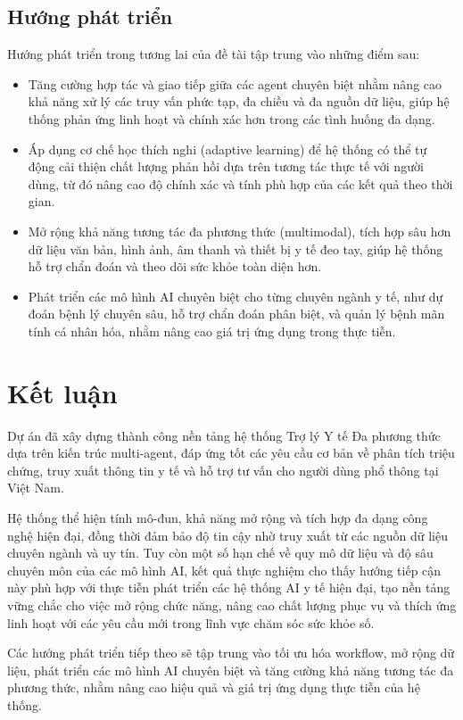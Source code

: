 \subsection{Hướng phát triển}

Hướng phát triển trong tương lai của đề tài tập trung vào những điểm sau:

\begin{itemize}
    \item Tăng cường hợp tác và giao tiếp giữa các agent chuyên biệt nhằm nâng cao khả năng xử lý các truy vấn phức tạp, đa chiều và đa nguồn dữ liệu, giúp hệ thống phản ứng linh hoạt và chính xác hơn trong các tình huống đa dạng.

    \item Áp dụng cơ chế học thích nghi (adaptive learning) để hệ thống có thể tự động cải thiện chất lượng phản hồi dựa trên tương tác thực tế với người dùng, từ đó nâng cao độ chính xác và tính phù hợp của các kết quả theo thời gian.
    
    \item Mở rộng khả năng tương tác đa phương thức (multimodal), tích hợp sâu hơn dữ liệu văn bản, hình ảnh, âm thanh và thiết bị y tế đeo tay, giúp hệ thống hỗ trợ chẩn đoán và theo dõi sức khỏe toàn diện hơn.

    \item Phát triển các mô hình AI chuyên biệt cho từng chuyên ngành y tế, như dự đoán bệnh lý chuyên sâu, hỗ trợ chẩn đoán phân biệt, và quản lý bệnh mãn tính cá nhân hóa, nhằm nâng cao giá trị ứng dụng trong thực tiễn.
\end{itemize}

\section{Kết luận}

Dự án đã xây dựng thành công nền tảng hệ thống Trợ lý Y tế Đa phương thức dựa trên kiến trúc multi-agent, đáp ứng tốt các yêu cầu cơ bản về phân tích triệu chứng, truy xuất thông tin y tế và hỗ trợ tư vấn cho người dùng phổ thông tại Việt Nam. 

Hệ thống thể hiện tính mô-đun, khả năng mở rộng và tích hợp đa dạng công nghệ hiện đại, đồng thời đảm bảo độ tin cậy nhờ truy xuất từ các nguồn dữ liệu chuyên ngành và uy tín. Tuy còn một số hạn chế về quy mô dữ liệu và độ sâu chuyên môn của các mô hình AI, kết quả thực nghiệm cho thấy hướng tiếp cận này phù hợp với thực tiễn phát triển các hệ thống AI y tế hiện đại, tạo nền tảng vững chắc cho việc mở rộng chức năng, nâng cao chất lượng phục vụ và thích ứng linh hoạt với các yêu cầu mới trong lĩnh vực chăm sóc sức khỏe số. 

Các hướng phát triển tiếp theo sẽ tập trung vào tối ưu hóa workflow, mở rộng dữ liệu, phát triển các mô hình AI chuyên biệt và tăng cường khả năng tương tác đa phương thức, nhằm nâng cao hiệu quả và giá trị ứng dụng thực tiễn của hệ thống. 